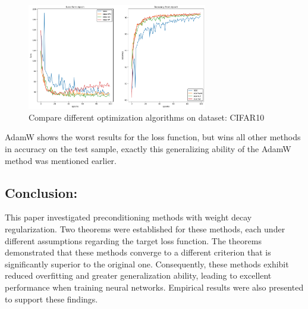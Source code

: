 \documentclass{article}
\begin{document}
\begin{figure}[H]
\centering
    \includegraphics[width=0.7\textwidth]{pictures/nn_results.png}
    \caption{Compare different optimization algorithms on dataset: CIFAR10}

        \label{fig:main_resnet18}
\end{figure}
AdamW shows the worst results for the loss function, but wins all other methods in accuracy on the test sample, exactly this generalizing ability of the AdamW method was mentioned earlier.

\subsection{Conclusion:}
This paper investigated preconditioning methods with weight decay regularization. Two theorems were established for these methods, each under different assumptions regarding the target loss function. The theorems demonstrated that these methods converge to a different criterion that is significantly superior to the original one. Consequently, these methods exhibit reduced overfitting and greater generalization ability, leading to excellent performance when training neural networks. Empirical results were also presented to support these findings.




\end{document}
